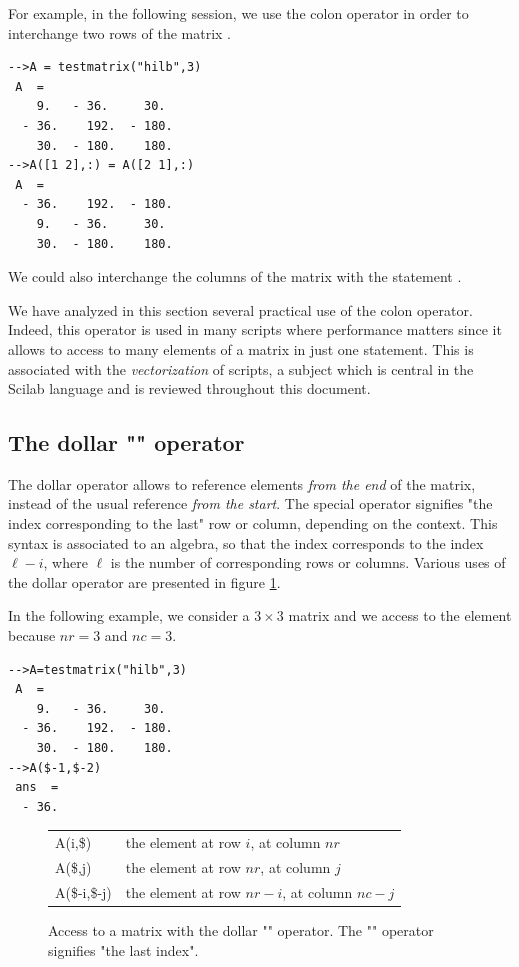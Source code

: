 For example, in the following session, we use the colon operator
in order to interchange two rows of the matrix .
\lstset{language=scilabscript}
\begin{lstlisting}
-->A = testmatrix("hilb",3)
 A  =
    9.   - 36.     30.   
  - 36.    192.  - 180.  
    30.  - 180.    180.  
-->A([1 2],:) = A([2 1],:)
 A  =
  - 36.    192.  - 180.  
    9.   - 36.     30.   
    30.  - 180.    180.  
\end{lstlisting}
We could also interchange the columns of the matrix  with 
the statement .

We have analyzed in this section several practical use of the colon
operator. Indeed, this operator is used in many scripts 
where performance matters since it allows to access to many
elements of a matrix in just one statement. This is associated with the 
\emph{vectorization} of scripts, a subject which is central
in the Scilab language and is reviewed throughout this 
document.

\subsection{The dollar "\scivar{\$}" operator}

The dollar \scivar{\$} operator allows to reference elements \emph{from the end}
of the matrix, instead of the usual reference \emph{from the start}.
The special operator \scivar{\$} signifies "the index corresponding to the 
last" row or column, depending on the context.
This syntax is associated to an algebra, so that the index 
corresponds to the index $\ell - i$, where $\ell$ is the 
number of corresponding rows or columns. Various uses 
of the dollar operator are presented in figure \ref{fig-introscilab-dollaroperator}.

In the following example, we consider a $3\times 3$ matrix and 
we access to the element 
because $nr=3$ and $nc=3$.
\lstset{language=scilabscript}
\begin{lstlisting}
-->A=testmatrix("hilb",3)
 A  =
    9.   - 36.     30.   
  - 36.    192.  - 180.  
    30.  - 180.    180.  
-->A($-1,$-2)
 ans  =
  - 36.  
\end{lstlisting}

\begin{figure}
\begin{center}
\begin{tabular}{|ll|}
\hline
A(i,\$) & the element at row $i$, at column $nr$\\
A(\$,j) & the element at row $nr$, at column $j$\\
A(\$-i,\$-j) & the element at row $nr-i$, at column $nc-j$\\
\hline
\end{tabular}
\end{center}
\caption{Access to a matrix with the dollar "\scivar{\$}" operator. 
The "\scivar{\$}" operator signifies "the last index".}
\label{fig-introscilab-dollaroperator}
\end{figure}

